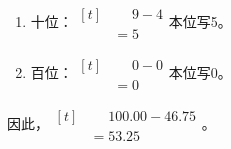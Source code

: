 {\begin{enumerate}[leftmargin=1.7em,itemsep=5pt,topsep=0pt]
\item 十位：\(\begin{aligned}[t]&\phantom{={}}9-4\\&=5\end{aligned}\)\quad 本位写5。
\item 百位：\(\begin{aligned}[t]&\phantom{={}}0-0\\&=0\end{aligned}\)\quad 本位写0。
\end{enumerate}
\par\smallskip
因此，\(\begin{aligned}[t]&\phantom{={}}100.00-46.75\\&=53.25\end{aligned}\)。
\par\medskip

}
